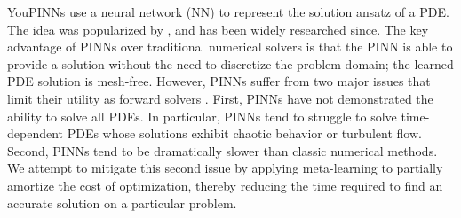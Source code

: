 
YouPINNs use a neural network (NN) to represent the solution ansatz of a PDE.
The idea was popularized by \citet{raissi2019physics}, and has been widely researched since.
The key advantage of PINNs over traditional numerical solvers is that the PINN is able to provide a solution without the need to discretize the problem domain; the learned PDE solution is mesh-free.
However, PINNs suffer from two major issues that limit their utility as forward solvers \citep{perdikaris2022respectingcausality}.
First, PINNs have not demonstrated the ability to solve all PDEs. In particular, PINNs tend to struggle to solve time-dependent PDEs whose solutions exhibit chaotic behavior or turbulent flow.
Second, PINNs tend to be dramatically slower than classic numerical methods.
We attempt to mitigate this second issue by applying meta-learning to partially amortize the cost of optimization, thereby reducing the time required to find an accurate solution on a particular problem.


